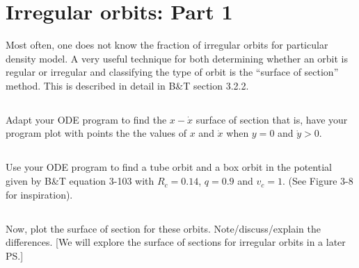 \section{Irregular orbits: Part 1}
Most often, one does not know the fraction of irregular orbits for particular density model. A very useful technique for both determining whether an orbit is regular or irregular and classifying the type of orbit
is the “surface of section” method. This is described in detail in B\&T section 3.2.2.

\subsection{}
Adapt your ODE program to find the $x-\Dot{x}$ surface of section that
is, have your program plot with points the the values of $x$ and $\Dot{x}$
when $y = 0$ and $\Dot{y}> 0$.




\subsection{}
Use your ODE program to find a tube orbit and a box orbit in the
potential given by B\&T equation 3-103 with $R_c = 0.14$, $q = 0.9$
and $v_c = 1$. (See Figure 3-8 for inspiration).




\subsection{}
Now, plot the surface of section for these orbits. Note/discuss/explain
the differences. [We will explore the surface of sections for irregular orbits in a later PS.]
